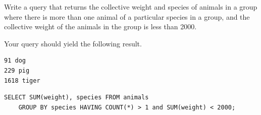\begin{blocksection}
Write a query that returns the collective weight and species of animals in a group where there is more than one animal of a particular species in a group, and the collective weight of the animals in the group is less than 2000.

Your query should yield the following result.

\begin{lstlisting}
91 dog
229 pig
1618 tiger
\end{lstlisting}

\begin{solution}[1.5in]
\begin{lstlisting}
SELECT SUM(weight), species FROM animals
    GROUP BY species HAVING COUNT(*) > 1 and SUM(weight) < 2000;
\end{lstlisting}
\end{solution}
\end{blocksection}
